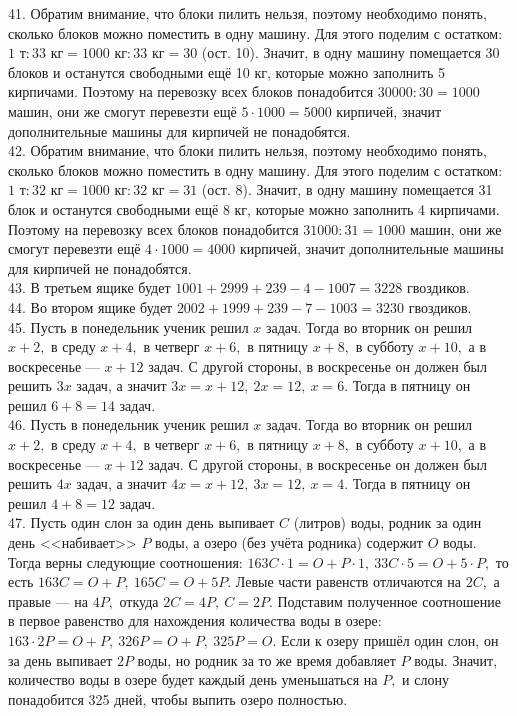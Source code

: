 41. Обратим внимание, что блоки пилить нельзя, поэтому необходимо понять, сколько блоков можно поместить в одну машину. Для этого поделим с остатком:
$1\text{ т}:33\text{ кг}=1000\text{ кг}:33\text{ кг}=30$ (ост. 10). Значит, в одну машину помещается 30 блоков и останутся свободными ещё 10 кг, которые можно заполнить 5 кирпичами. Поэтому на перевозку всех блоков понадобится $30000:30=1000$ машин, они же смогут перевезти ещё $5\cdot1000=5000$ кирпичей, значит дополнительные машины для кирпичей не понадобятся.\\
42. Обратим внимание, что блоки пилить нельзя, поэтому необходимо понять, сколько блоков можно поместить в одну машину. Для этого поделим с остатком:
$1\text{ т}:32\text{ кг}=1000\text{ кг}:32\text{ кг}=31$ (ост. 8). Значит, в одну машину помещается 31 блок и останутся свободными ещё 8 кг, которые можно заполнить 4 кирпичами. Поэтому на перевозку всех блоков понадобится $31000:31=1000$ машин, они же смогут перевезти ещё $4\cdot1000=4000$ кирпичей, значит дополнительные машины для кирпичей не понадобятся.\\
43. В третьем ящике будет $1001+2999+239-4-1007=3228$ гвоздиков.\\
44. Во втором ящике будет $2002+1999+239-7-1003=3230$ гвоздиков.\\
45. Пусть в понедельник ученик решил $x$ задач. Тогда во вторник он решил $x+2,$ в среду $x+4,$ в четверг $x+6,$ в пятницу $x+8,$ в субботу $x+10,$ а в воскресенье --- $x+12$ задач. С другой стороны, в воскресенье он должен был решить $3x$ задач, а значит $3x=x+12,\ 2x=12,\ x=6.$ Тогда в пятницу он решил $6+8=14$ задач.\\
46. Пусть в понедельник ученик решил $x$ задач. Тогда во вторник он решил $x+2,$ в среду $x+4,$ в четверг $x+6,$ в пятницу $x+8,$ в субботу $x+10,$ а в воскресенье --- $x+12$ задач. С другой стороны, в воскресенье он должен был решить $4x$ задач, а значит $4x=x+12,\ 3x=12,\ x=4.$ Тогда в пятницу он решил $4+8=12$ задач.\\
47. Пусть один слон за один день выпивает $C$ (литров) воды, родник за один день <<набивает>> $P$ воды, а озеро (без учёта родника) содержит $O$ воды. Тогда верны следующие соотношения: $163C\cdot1=O+P\cdot1,\ 33C\cdot5=O+5\cdot P,$ то есть $163C=O+P,\ 165C=O+5P.$ Левые части равенств отличаются на $2C,$ а правые --- на $4P,$ откуда $2C=4P,\ C=2P.$ Подставим полученное соотношение в первое равенство для нахождения количества воды в озере: $163\cdot2P=O+P,\ 326P=O+P,\ 325P=O.$ Если к озеру пришёл один слон, он за день выпивает $2P$ воды, но родник за то же время добавляет $P$ воды. Значит, количество воды в озере будет каждый день уменьшаться на $P,$ и слону понадобится 325 дней, чтобы выпить озеро полностью.\\
